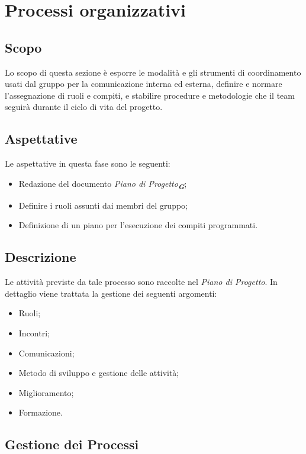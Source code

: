 

\section{Processi organizzativi}
\label{sec:processi_organizzativi}

\subsection{Scopo}
Lo scopo di questa sezione è esporre le modalità e gli strumenti di coordinamento usati dal gruppo per la comunicazione interna ed esterna, 
definire e normare l’assegnazione di ruoli e compiti, e stabilire procedure e metodologie che il team seguirà durante il 
ciclo di vita del progetto.

\subsection{Aspettative}
Le aspettative in questa fase sono le seguenti:
\begin{itemize}
    \item Redazione del documento \emph{Piano di Progetto}\textsubscript{\textit{\textbf{G}}};
    \item Definire i ruoli assunti dai membri del gruppo;
    \item Definizione di un piano per l'esecuzione dei compiti programmati.
\end{itemize}

\subsection{Descrizione}
Le attività previste da tale processo sono raccolte nel \emph{Piano di Progetto}.
In dettaglio viene trattata la gestione dei seguenti argomenti:
\begin{itemize}
    \item Ruoli;
    \item Incontri;
    \item Comunicazioni;
    \item Metodo di sviluppo e gestione delle attività;
    \item Miglioramento;
    \item Formazione.
\end{itemize}

\subsection{Gestione dei Processi}

